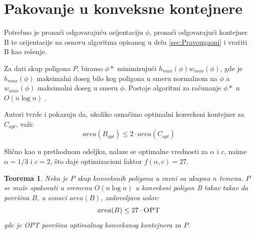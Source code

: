 \documentclass[a4paper]{article}
\theoremstyle{plain}
\newtheorem{thm}{Teorema}[section] %
\theoremstyle{definition}
\begin{document}
\section{Pakovanje u konveksne kontejnere}
\label{sec:Konveksni}

Potrebno je prona\'c{}i odgovaraju\'c{}u orijentaciju $\phi$, prona\'c{}i odgovaraju\'c{}i kontejner B te orijentacije na osnovu algoritma opisanog u delu \ref{sec:Pravougaoni} i vratiti B kao re\v{s}enje.

Za dati skup poligona $P$, biramo $\phi*$  minimizuju\'c{}i $h_{max}(\phi)w_{max}(\phi)$, gde je $h_{max}(\phi)$ maksimalni doseg bilo kog poligona u smeru normalnom na $\phi$ a $w_{max}(\phi)$ maksimalni doseg u smeru $\phi$. Postoje algoritmi za ra\v{c}unanje $\phi*$ u $O(n\log{}n)$ \cite{BuildingThreeConvexPolygons}.

Autori tvrde i pokazuju da, ukoliko ozna\v{c}imo optimalni konveksni kontejner sa $C_{opt}$, va\v{z}i: $$area(B_{opt}) \leq 2 \cdot area(C_{opt})$$

Sli\v{c}no kao u prethodnom odeljku, nalaze se optimalne vrednosti za $\alpha$ i $c$, naime $\alpha = 1/3$ i $c = 2$, \v{s}to daje optimizacioni faktor $f(\alpha, c) = 27$.

\begin{thm}
    Neka je $P$ skup konveksnih poligona u ravni sa ukupno $n$ temena. $P$ se mo\v{z}e spakovati u vremenu $O(n\log{}n)$ u konveksni poligon B takav takav da povr\v{s}ina $B$, u oznaci $area(B)$, zadovoljava uslov: $$area(B) \leq 27 \cdot \textsc{OPT}$$ gde je \textsc{OPT} povr\v{s}ina optimalnog konveksnog kontejnera za $P$.  
\end{thm}


\appendix



\end{document}
